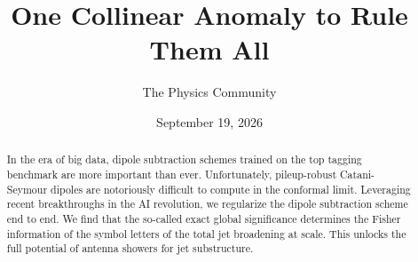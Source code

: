 \documentclass[11pt]{article}
\title{One Collinear Anomaly to Rule Them All}
\author{The Physics Community}
\date{September 19, 2026}
\begin{document}
\maketitle
\begin{abstract}
In the era of big data, dipole subtraction schemes trained on the top
tagging benchmark are more important than ever. Unfortunately,
pileup-robust Catani-Seymour dipoles are notoriously difficult to
compute in the conformal limit. Leveraging recent breakthroughs in the
AI revolution, we regularize the dipole subtraction scheme end to end.
We find that the so-called exact global significance determines the
Fisher information of the symbol letters of the total jet broadening at
scale. This unlocks the full potential of antenna showers for jet
substructure.
\end{abstract}
\tableofcontents




\nocite{*}


\end{document}
